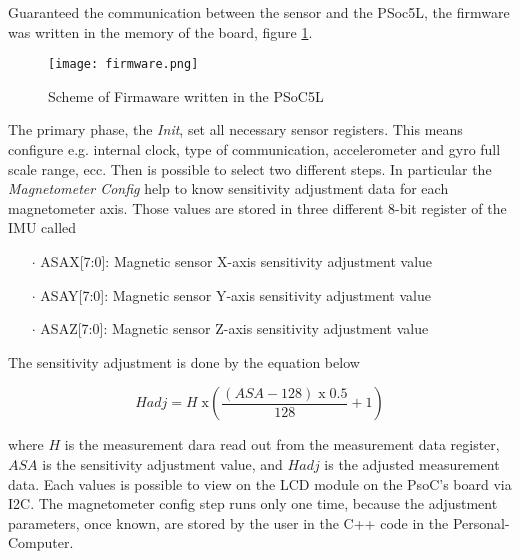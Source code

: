  
Guaranteed the communication between the sensor and the PSoc5L,  the firmware was written in the memory of the board, figure \ref{fig:psocfirmware}. 
\begin{figure}[h]
\centering
\texttt{[image: firmware.png]}
\caption{Scheme of Firmaware written in the PSoC5L}
\label{fig:psocfirmware}
\end{figure}  
\noindent The primary phase, the  \textit{Init}, set all necessary sensor registers. This means configure e.g. internal clock,   type of communication, accelerometer and gyro full scale range, ecc. Then is possible to select two different steps. In particular the \textit{Magnetometer Config} help to know sensitivity adjustment data for each magnetometer axis. Those values are stored in three different 8-bit register of  the IMU called
\begin{enumerate}
\item[$\cdot$] ASAX[7:0]: Magnetic sensor X-axis sensitivity adjustment value
\item[$\cdot$] ASAY[7:0]: Magnetic sensor Y-axis sensitivity adjustment value
\item[$\cdot$] ASAZ[7:0]: Magnetic sensor Z-axis sensitivity adjustment value
\end{enumerate}

\noindent The sensitivity adjustment is done by the equation below

\begin{equation}
\displaystyle Hadj = H \;  \text{x} \left(          \frac{ \left(ASA - 128\right)\; \text{x} \; 0.5 }{128} + 1        \right)
\end{equation} 

\noindent where $H$ is the measurement dara read out from the measurement data register, $ASA$ is the sensitivity adjustment value, and $Hadj$ is the adjusted measurement data. Each values is possible to view on the LCD module on the PsoC's board via I2C. 
The magnetometer config step runs only one time, because  the adjustment parameters, once known, are stored by the user in the C++ code in the Personal-Computer. 

